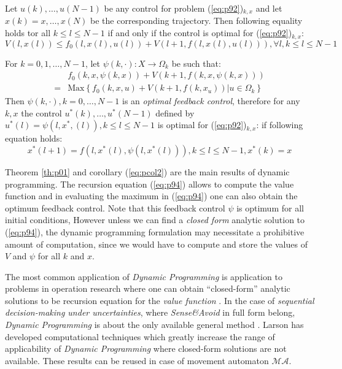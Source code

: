 \begin{corollary}
Let  $u(k),\dots,u(N-1)$ be any control for problem (\ref{eq:p92})$_{k,x}$ and let $x(k) = x,\dots,x(N)$ be the corresponding trajectory. Then following equality holds tor all $k \le l \le N-1$  if and only if the control is optimal for (\ref{eq:p92})$_{k,x}$:
\begin{equation}
    V(l,x(l)) \le f_0(l,x(l),u(l)) + V(l+1,f(l,x(l),u(l))), \forall l, k \le l \le N-1
\end{equation}
\end{corollary}
\begin{corollary}
For $k=0,1,\dots,N-1$, let $\psi(k,\cdot): X\to \Omega_k$ be such that:
\begin{equation}
    \begin{split}
    & f_0(k,x,\psi(k,x))+ V(k+1,f(k,x,\psi(k,x)))\\
    =&\text{Max}\left\{f_0(k,x,u)+ V(k+1,f(k,x_u))|u\in\Omega_k\right\}
    \end{split}
\end{equation}
\noindent Then $\psi(k,\cdot), k = 0,\dots,N-1$ is an \textit{optimal feedback control}, therefore for any $k,x$ the control $u^*(k),\dots,u^*(N-1)$ defined by $u^*(l)=\psi(l,x^*,(l)), k \le l \le N-1$ is optimal for (\ref{eq:p92})$_{k,x}$: if following equation holds:
\begin{equation}\label{eq:pcol2}
    x^*(l+1)=f(l,x^*(l),\psi(l,x^*(l))), k \le l \le N-1, x^*(k)=x
\end{equation}
\end{corollary}
\noindent Theorem \ref{th:p01} and corollary (\ref{eq:pcol2}) are the main results of dynamic programming. The recursion equation (\ref{eq:p94}) allows to compute the value function and in evaluating the maximum in (\ref{eq:p94}) one can also obtain the optimum feedback control. Note that this feedback control $\psi$ is optimum for all initial conditions, However unless we can find a \textit{closed form} analytic solution to (\ref{eq:p94}), the dynamic programming formulation may necessitate a prohibitive amount of computation, since we would have to compute and store the values of $V$ and $\psi$ for all $k$ and $x$.

The most common application of \textit{Dynamic Programming} is application to problems in operation research where one can obtain “closed-form” analytic solutions to be recursion equation for the \textit{value function} \cite{re1962applied,wagner1969principles}. In the case of \textit{sequential decision-making under uncertainties}, where \textit{Sense\&Avoid} in full form belong, \textit{Dynamic Programming} is about the only available general method \cite{howard1960dynamic}. Larson \cite{larson1968state} has developed computational techniques which greatly increase the range of applicability of \textit{Dynamic Programming} where closed-form solutions are not available. These results can be reused in case of movement automaton $\mathscr{MA}$.
